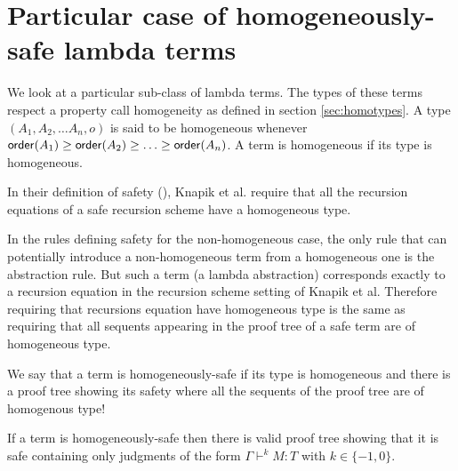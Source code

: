 \section{Particular case of homogeneously-safe lambda terms}

We look at a particular sub-class of lambda terms. The types of
these terms respect a property call homogeneity as defined in
section \ref{sec:homotypes}. A type $(A_1, A_2, \ldots A_n, o)$ is
said to be homogeneous whenever ${\sf order}(A_1) \geq {\sf order}(A_2) \geq
\ldots \geq  {\sf order}(A_n)$. A term is homogeneous if its type is
homogeneous.


In their definition of safety (\cite{KNU02}), Knapik et al. require
that all the recursion equations of a safe recursion scheme have a
homogeneous type.

In the rules defining safety for the non-homogeneous case, the only
rule that can potentially introduce a non-homogeneous term from a
homogeneous one is the abstraction rule. But such a term (a lambda
abstraction) corresponds exactly to a recursion equation in the
recursion scheme setting of Knapik et al. Therefore requiring that
recursions equation have homogeneous type is the same as requiring
that all sequents appearing in the proof tree of a safe term are of
homogeneous type.

We say that a term is homogeneously-safe if its type is homogeneous
and there is a proof tree showing its safety where all the sequents
of the proof tree are of homogenous type!

\begin{lem}
\label{lem:homog_judg_zero_minusone} If a term is homogeneously-safe
then there is valid proof tree showing that it is safe containing
only judgments of the form $\Gamma \vdash^{k} M : T$ with $k\in
\{-1,0\}$.
\end{lem}

